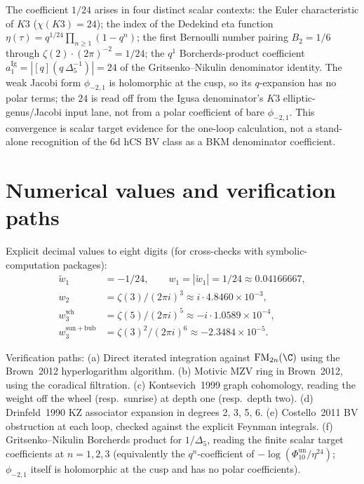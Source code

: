 \begin{remark}
\label{rem:one-loop-eta-K3}
The coefficient $1/24$ arises in four distinct scalar
contexts: the Euler characteristic of $K3$ ($\chi(K3) = 24$); the
index of the Dedekind eta function
$\eta(\tau) = q^{1/24}\prod_{n\geq 1}(1 - q^n)$; the first
Bernoulli number pairing $B_2 = 1/6$ through
$\zeta(2)\cdot (2\pi)^{-2} = 1/24$; the $q^{1}$ Borcherds-product
coefficient $a_1^{\mathrm{Ig}}=|[q](q\,\Delta_5^{-1})|=24$ of the
Gritsenko--Nikulin denominator identity. The weak Jacobi form
$\phi_{-2,1}$ is holomorphic at the cusp, so its $q$-expansion has no
polar terms; the $24$ is read off from the Igusa denominator's
$K3$ elliptic-genus/Jacobi input lane, not from a polar coefficient of
bare $\phi_{-2,1}$. This convergence is scalar target evidence for the
one-loop calculation, not a stand-alone recognition of the 6d hCS BV
class as a BKM denominator coefficient.
\end{remark}

\section{Numerical values and verification paths}
\label{sec:numerics}

Explicit decimal values to eight digits (for cross-checks with
symbolic-computation packages):
\begin{align*}
\widetilde w_1 &= -1/24,\qquad w_1=|\widetilde w_1|=1/24
\approx 0.04166667, \\
w_2 &= \zeta(3)/(2\pi i)^3 \approx i\cdot 4.8460\times 10^{-3}, \\
w_3^{\mathrm{wh}} &= \zeta(5)/(2\pi i)^5 \approx -i\cdot 1.0589\times 10^{-4}, \\
w_3^{\mathrm{sun+bub}} &= \zeta(3)^2/(2\pi i)^6 \approx
-2.3484\times 10^{-5}.
\end{align*}

Verification paths:
(a) Direct iterated integration against $\FM_{2n}(\C)$ using the
Brown~2012 hyperlogarithm algorithm.
(b) Motivic MZV ring in Brown~2012, using the coradical filtration.
(c) Kontsevich~1999 graph cohomology, reading the weight off the
wheel (resp.\ sunrise) at depth one (resp.\ depth two).
(d) Drinfeld~1990 KZ associator expansion in degrees 2, 3, 5, 6.
(e) Costello~2011 BV obstruction at each loop, checked against the
explicit Feynman integrals.
(f) Gritsenko--Nikulin Borcherds product for $1/\Delta_5$,
reading the finite scalar target coefficients at $n = 1, 2, 3$
(equivalently the $q^{n}$-coefficient of
$-\log(\Phi_{10}^{\mathrm{un}}/\eta^{24})$; $\phi_{-2,1}$ itself is holomorphic
at the cusp and has no polar coefficients).

